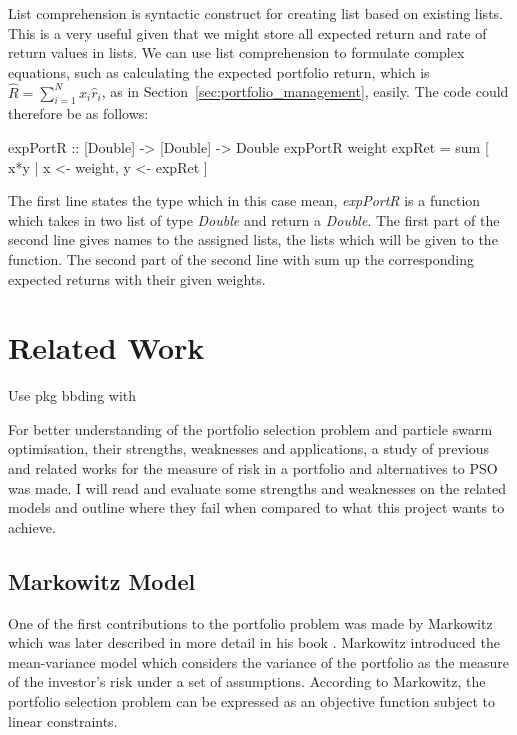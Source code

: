 \documentclass{pdfmx4020}
\begin{document}
  List comprehension \cite{list_comp} is syntactic construct for creating list based on existing lists. This is a very useful given that we might store all expected return and rate of return values in lists. We can use list comprehension to formulate complex equations, such as calculating the expected portfolio return, which is $\widehat{R} = \sum_{i=1}^N  x_i \widehat{r}_i$, as in Section~\ref{sec:portfolio_management}, easily. The code could therefore be as follows: 
  \begin{code}
  expPortR :: [Double] -> [Double] -> Double
  expPortR weight expRet = sum [ x*y | x <- weight, y <- expRet ]
  \end{code}
  The first line states the type which in this case mean, \textit{expPortR} is a function which takes in two list of type \textit{Double} and return a \textit{Double}. The first part of the second line gives names to the assigned lists, the lists which will be given to the function. The second part of the second line with sum up the corresponding expected returns with their given weights. 

    


\chapter{Related Work}
Use pkg bbding with 

For better understanding of the portfolio selection problem and particle swarm optimisation, their strengths, weaknesses and applications, a study of previous and related works for the measure of risk in a portfolio and alternatives to PSO was made. I will read and evaluate some strengths and weaknesses on the related models and outline where they fail when compared to what this project wants to achieve. 

  \section{Markowitz Model} %
  \label{sec:markowitz_model}
    One of the first contributions to the portfolio problem was made by Markowitz \cite{marko1} which was later described in more detail in his book \cite{marko2}. Markowitz introduced the mean-variance model which considers the variance of the portfolio as the measure of the investor's risk under a set of assumptions. According to Markowitz, the portfolio selection problem can be expressed as an objective function subject to linear constraints. 
\end{document}

